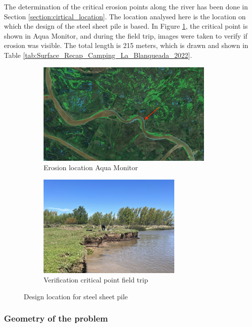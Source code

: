The determination of the critical erosion points along the river has been done in Section \ref{section:cirtical_location}. The location analysed here is the location on which the design of the steel sheet pile is based. In Figure \ref{fig:critical_location_google}, the critical point is shown in Aqua Monitor, and during the field trip, images were taken to verify if erosion was visible. The total length is 215 meters, which is drawn and shown in Table \ref{tab:Surface_Recap_Camping_La_Blanqueada_2022}.

\begin{figure}[H]
    \centering
    \begin{subfigure}[b]{0.45\textwidth}
        \includegraphics[width=\linewidth, height=5cm]{figures/ch8/1985-2025_ch8.jpg}
        \caption{Erosion location Aqua Monitor}
        \label{fig:critical_location_google}
    \end{subfigure}
    \hfill
    \begin{subfigure}[b]{0.45\textwidth}
        \includegraphics[width=\linewidth, height=5cm]{figures/ch8/critical_location.jpeg}
        \caption{Verification critical point field trip}
        \label{fig:critical_location_fieldtrip}
    \end{subfigure}
    \caption{Design location for steel sheet pile}
    \label{fig:critical_location}
\end{figure}

\subsubsection{Geometry of the problem}

